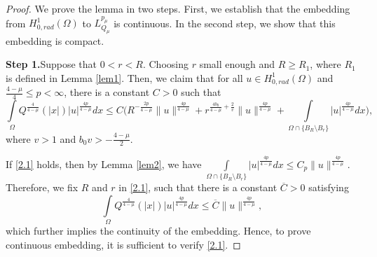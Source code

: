\documentclass[11pt]{amsart}
\numberwithin{equation}{section}
\newenvironment{step}[1]{\par\noindent\textbf{Step 1.}\space#1}{}
\newcommand{\hr}{H^1_{0, rad}(\Omega)}
\newcommand{\1}{\frac{1}{2}}
\begin{document}
	\begin{proof}
		We prove the lemma in two steps. First, we establish that the embedding from $\hr$ to $L^{p_\mu}_{Q_\mu}$ is continuous. In the second step, we show that this embedding is compact.
		\begin{step}
			Suppose that $0<r<R$. Choosing $r$ small enough and $R\geq R_1$, where $R_1$ is defined in Lemma \ref{lem1}. Then, we claim that for all $u\in \hr$ and $\frac{4-\mu}{4} \leq p <\infty$, there is a constant $C>0$ such that
			\begin{equation}
				\label{2.1}
				\int\limits_\Omega Q^{\frac{4}{4-\mu}}(|x|) |u|^{\frac{4p}{4-\mu}}dx \leq C \Bigg(R^{-\frac{2p}{4-\mu}}\|u\|^{\frac{4p}{4-\mu}}+ r^{\frac{4b_0}{4-\mu}+\frac{2}{v}}\|u\|^{\frac{4p}{4-\mu}} + \int\limits_{\Omega \cap \{B_R\setminus B_r\}} |u|^{\frac{4p}{4-\mu}}dx \Bigg),
			\end{equation}
			where $v>1$ and $b_0v > -\frac{4-\mu}{2}$. 
			
			If \eqref{2.1} holds, then by Lemma \ref{lem2}, we have
			$\int\limits_{\Omega \cap \{B_R\setminus B_r\}} |u|^{\frac{4p}{4-\mu}}dx \leq C_p \|u\|^{\frac{4p}{4-\mu}}.$
			Therefore, we fix $R$  and $r$ in \eqref{2.1}, such that there is a constant $\overline{C}>0$ satisfying
			\begin{equation*}
				\int\limits_\Omega Q^{\frac{4}{4-\mu}}(|x|) |u|^{\frac{4p}{4-\mu}}dx \leq \overline{C} \|u\|^{\frac{4p}{4-\mu}},
			\end{equation*}
			which further implies the continuity of the embedding. Hence, to prove continuous embedding, it is sufficient to verify \eqref{2.1}.
			

\end{step}
\end{proof}
\end{document}
